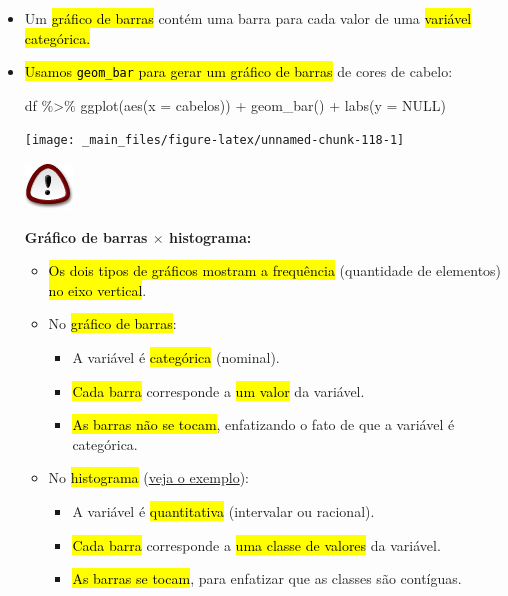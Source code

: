 \documentclass[
  11pt]{report}
\newenvironment{Shaded}{\begin{snugshade}}{\end{snugshade}}
\newcommand{\AttributeTok}[1]{\textcolor[rgb]{0.77,0.63,0.00}{#1}}
\newcommand{\ConstantTok}[1]{\textcolor[rgb]{0.00,0.00,0.00}{#1}}
\newcommand{\FunctionTok}[1]{\textcolor[rgb]{0.00,0.00,0.00}{#1}}
\newcommand{\NormalTok}[1]{#1}
\newcommand{\SpecialCharTok}[1]{\textcolor[rgb]{0.00,0.00,0.00}{#1}}
\newenvironment{rmdimportant}
{
  \begin{myimportant}
    \includegraphics{images/important.png}
    \tcblower
  }
  {
  \end{myimportant}
}
\renewenvironment{Shaded}{
    \begin{mdframed}[%
      roundcorner=2pt,%
      innerleftmargin=5pt,%
      innerrightmargin=5pt,%
      topline=true,%
      leftline=true,%
      rightline=true,%
      bottomline=true,%
      linewidth=0.5pt,%
      linecolor=black!20,%
      backgroundcolor=black!2,%
      skipabove=2ex,%
      skipbelow=2.5ex%
    ]%
  }
  {
    \end{mdframed}
  }
\begin{document}
\begin{itemize}
\item
  Um {\hl{gráfico de barras}} contém uma barra para cada valor de uma {\hl{variável categórica.}}
\item
  {\hl{Usamos {\mbox{\texttt{geom\_bar}}} para gerar um gráfico de barras}} de cores de cabelo:

\begin{Shaded}
\begin{Highlighting}[]
\NormalTok{df }\SpecialCharTok{\%\textgreater{}\%} 
  \FunctionTok{ggplot}\NormalTok{(}\FunctionTok{aes}\NormalTok{(}\AttributeTok{x =}\NormalTok{ cabelos)) }\SpecialCharTok{+}
    \FunctionTok{geom\_bar}\NormalTok{() }\SpecialCharTok{+}
    \FunctionTok{labs}\NormalTok{(}\AttributeTok{y =} \ConstantTok{NULL}\NormalTok{)}
\end{Highlighting}
\end{Shaded}

  \begin{center}\texttt{[image: \_main\_files/figure-latex/unnamed-chunk-118-1]} \end{center}

  \begin{rmdimportant}

  \textbf{Gráfico de barras $\times$ histograma:}

  \begin{itemize}
  \item
    {\hl{Os dois tipos de gráficos mostram a frequência}} (quantidade de elementos) {\hl{no eixo vertical}}.
  \item
    No {\hl{gráfico de barras}}:

    \begin{itemize}
    \item
      A variável é {\hl{categórica}} (nominal).
    \item
      {\hl{Cada barra}} corresponde a {\hl{um valor}} da variável.
    \item
      {\hl{As barras não se tocam}}, enfatizando o fato de que a variável é categórica.
    \end{itemize}
  \item
    No {\hl{histograma}} (\protect\hyperlink{histograma1}{veja o exemplo}):

    \begin{itemize}
    \item
      A variável é {\hl{quantitativa}} (intervalar ou racional).
    \item
      {\hl{Cada barra}} corresponde a {\hl{uma classe de valores}} da variável.
    \item
      {\hl{As barras se tocam}}, para enfatizar que as classes são contíguas.
    \end{itemize}
  \end{itemize}


\end{rmdimportant}
\end{itemize}
\end{document}
